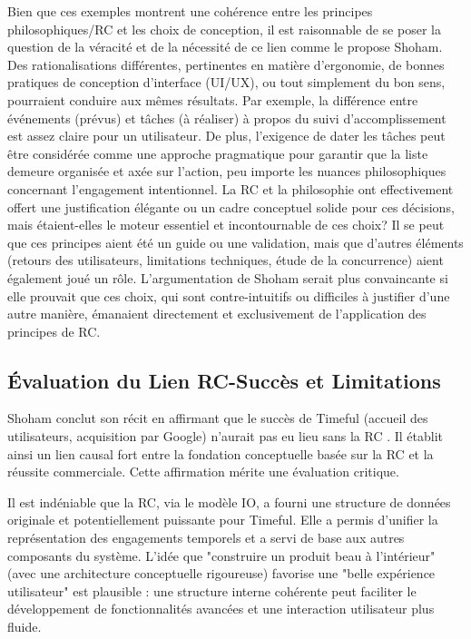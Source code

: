 \documentclass[11pt,a4paper]{article}
\begin{document}
Bien que ces exemples montrent une cohérence entre les principes philosophiques/RC et les choix de conception, il est raisonnable de se poser la question de la véracité et de la nécessité de ce lien comme le propose Shoham. Des rationalisations différentes, pertinentes en matière d'ergonomie, de bonnes pratiques de conception d'interface (UI/UX), ou tout simplement du bon sens, pourraient conduire aux mêmes résultats. Par exemple, la différence entre événements (prévus) et tâches (à réaliser) à propos du suivi d'accomplissement est assez claire pour un utilisateur. De plus, l'exigence de dater les tâches peut être considérée comme une approche pragmatique pour garantir que la liste demeure organisée et axée sur l'action, peu importe les nuances philosophiques concernant l'engagement intentionnel. La RC et la philosophie ont effectivement offert une justification élégante ou un cadre conceptuel solide pour ces décisions, mais étaient-elles le moteur essentiel et incontournable de ces choix? Il se peut que ces principes aient été un guide ou une validation, mais que d'autres éléments (retours des utilisateurs, limitations techniques, étude de la concurrence) aient également joué un rôle. L'argumentation de Shoham serait plus convaincante si elle prouvait que ces choix, qui sont contre-intuitifs ou difficiles à justifier d'une autre manière, émanaient directement et exclusivement de l'application des principes de RC. 


\subsection{Évaluation du Lien RC-Succès et Limitations}

Shoham conclut son récit en affirmant que le succès de Timeful (accueil des utilisateurs, acquisition par Google) n'aurait pas eu lieu sans la RC \citep{Shoham2015Why}. Il établit ainsi un lien causal fort entre la fondation conceptuelle basée sur la RC et la réussite commerciale. Cette affirmation mérite une évaluation critique.

Il est indéniable que la RC, via le modèle IO, a fourni une structure de données originale et potentiellement puissante pour Timeful. Elle a permis d'unifier la représentation des engagements temporels et a servi de base aux autres composants du système. L'idée que "construire un produit beau à l'intérieur" (avec une architecture conceptuelle rigoureuse) favorise une "belle expérience utilisateur" \citep{Shoham2015Why} est plausible : une structure interne cohérente peut faciliter le développement de fonctionnalités avancées et une interaction utilisateur plus fluide.
\end{document}
